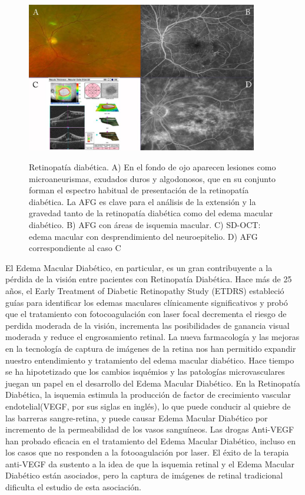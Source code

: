 \begin{figure}[H]
\centering
\includegraphics[width=0.9\textwidth]{./Figures/RD_AF.png}
\label{fig:lightfilter}
\caption{ Retinopatía diabética. A) En el fondo de ojo aparecen lesiones como microaneurismas, exudados duros y algodonosos, que en su conjunto forman el espectro habitual de presentación de la retinopatía diabética. La AFG es clave para el análisis de la extensión y la gravedad tanto de la retinopatía diabética como del edema macular diabético. B) AFG con áreas de isquemia macular. C) SD-OCT: edema macular con desprendimiento del neuroepitelio. D) AFG correspondiente al caso C}
\end{figure}

El Edema Macular Diab\'etico, en particular, es un gran contribuyente a la p\'erdida de la visi\'on  entre pacientes con Retinopat\'ia Diab\'etica. Hace m\'as de 25 a\~nos, el Early Treatment of Diabetic Retinopathy Study (ETDRS) estableci\'o gu\'ias para identificar los edemas maculares cl\'inicamente significativos y prob\'o que el tratamiento con fotocoagulaci\'on con laser focal decrementa el riesgo de perdida moderada de la visi\'on, incrementa las posibilidades de ganancia visual moderada y reduce el engrosamiento retinal. La nueva farmacolog\'ia y las mejoras en la tecnolog\'ia de captura de im\'agenes de la retina nos han permitido expandir nuestro entendimiento y tratamiento del edema macular diab\'etico.
Hace tiempo se ha hipotetizado que los cambios isqu\'emios y las patolog\'ias microvasculares  juegan un papel en el desarrollo del Edema Macular Diab\'etico. En la Retinopat\'ia Diab\'etica, la isquemia estimula la producci\'on de factor de crecimiento vascular endotelial(VEGF, por sus siglas en ingl\'es), lo que puede conducir al quiebre de las barreras sangre-retina, y puede causar Edema Macular Diab\'etico por incremento de la permeabilidad de los vasos sangu\'ineos. Las drogas Anti-VEGF han probado eficacia en el tratamiento del Edema Macular Diab\'etico, incluso en los casos que no responden a la fotooagulaci\'on por laser. El \'exito de la terapia anti-VEGF da sustento a la idea de que la isquemia retinal y el Edema Macular Diab\'etico est\'an asociados, pero la captura de im\'agenes de retinal tradicional dificulta el estudio de esta asociaci\'on. \citep{wessel2012peripheral}



